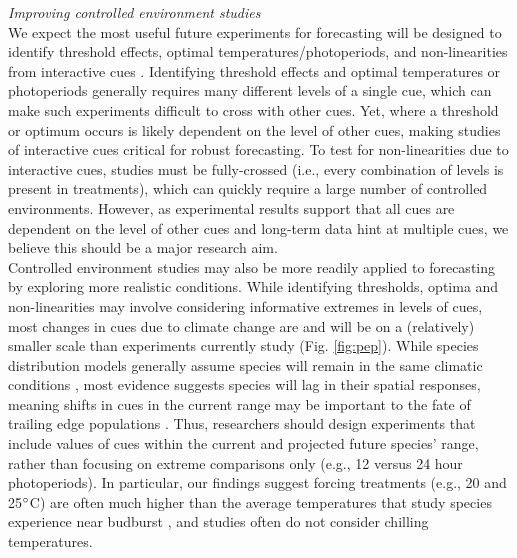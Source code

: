 \documentclass[11pt,letter]{article}
\begin{document}
\emph{Improving controlled environment studies}\\
We expect the most useful future experiments for forecasting will be designed to identify threshold effects, optimal temperatures/photoperiods, and non-linearities from interactive cues \citep{Caffarra:2011qf}. Identifying threshold effects and optimal temperatures or photoperiods generally requires many different levels of a single cue, which can make such experiments difficult to cross with other cues. Yet, where a threshold or optimum occurs is likely dependent on the level of other cues, making studies of interactive cues critical for robust forecasting. To test for non-linearities due to interactive cues, studies must be fully-crossed (i.e., every combination of levels is present in treatments), which can quickly require a large number of controlled environments. However, as experimental results support that all cues are dependent on the level of other cues \citep{stearns1958,flynn2018} and long-term data hint at multiple cues, we believe this should be a major research aim.\\

Controlled environment studies may also be more readily applied to forecasting by exploring more realistic conditions. While identifying thresholds, optima and non-linearities may involve considering informative extremes in levels of cues, most changes in cues due to climate change are and will be on a (relatively) smaller scale than experiments currently study (Fig. \ref{fig:pep}). While species distribution models generally assume species will remain in the same climatic conditions \citep{elith2009species}, most evidence suggests species will lag in their spatial responses, meaning shifts in cues in the current range may be important to the fate of trailing edge populations \citep{bertrand2011changes,lenoir2015climate}. Thus, researchers should design experiments that include values of cues within the current and projected future species' range, rather than focusing on extreme comparisons only (e.g., 12 versus 24 hour photoperiods). In particular, our findings suggest forcing treatments (e.g., 20 and 25$\degree$C) are often much higher than the average temperatures that study species experience near budburst \citep{fu2015,gusewell2017}, and studies often do not consider chilling temperatures. \\ %
\end{document}
